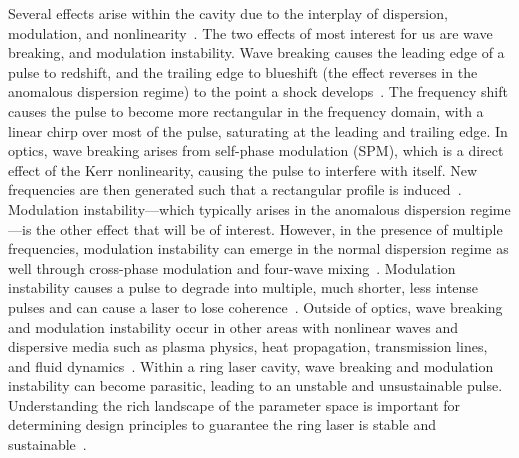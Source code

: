 \documentclass[9pt,twocolumn,twoside]{osajnl}
\begin{document}
Several effects arise within the cavity due to the interplay of dispersion, modulation, and nonlinearity~\cite{bohun2015, coen1997, lapre2019, meng2020, oktem2010, shao2019, woodward2018}. The two effects of most interest for us are wave breaking, and modulation instability. Wave breaking causes the leading edge of a pulse to redshift, and the trailing edge to blueshift (the effect reverses in the anomalous dispersion regime) to the point a shock develops~\cite{anderson1992, rothenberg1989a, rothenberg1989b, tomlinson1984, tomlinson1985}. The frequency shift causes the pulse to become more rectangular in the frequency domain, with a linear chirp over most of the pulse, saturating at the leading and trailing edge. In optics, wave breaking arises from self-phase modulation (SPM), which is a direct effect of the Kerr nonlinearity, causing the pulse to interfere with itself. New frequencies are then generated such that a rectangular profile is induced~\cite{agrawal2013, woodward2018}. Modulation instability---which typically arises in the anomalous dispersion regime---is the other effect that will be of interest. However, in the presence of multiple frequencies, modulation instability can emerge in the normal dispersion regime as well through cross-phase modulation and four-wave mixing~\cite{agrawal1987, agrawal2013, haelterman1992}. Modulation instability causes a pulse to degrade into multiple, much shorter, less intense pulses and can cause a laser to lose coherence~\cite{agrawal1987, coen1997, haelterman1992}. Outside of optics, wave breaking and modulation instability occur in other areas with nonlinear waves and dispersive media such as plasma physics, heat propagation, transmission lines, and fluid dynamics~\cite{coen1997, rothenberg1989b}. Within a ring laser cavity, wave breaking and modulation instability can become parasitic, leading to an unstable and unsustainable pulse. Understanding the rich landscape of the parameter space is important for determining design principles to guarantee the ring laser is stable and sustainable~\cite{bohun2015, burgoyneemail, finot2008, lapre2019, woodward2018}.
\end{document}

